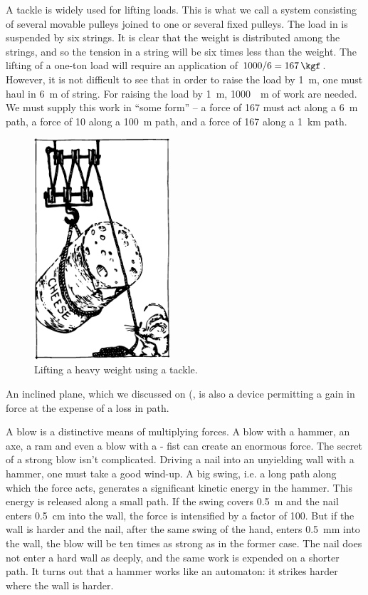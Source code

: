 A tackle is widely used for lifting loads. This is what
we call a system consisting of several movable pulleys
joined to one or several fixed pulleys. The load in  is suspended by six strings. It is clear that the weight
is distributed among the strings, and so the tension in
a string will be six times less than the weight. The lifting of a one-ton load will require an application of
$1000/6 = \SI{167}{\kgf}$. However, it is not difficult to see that
in order to raise the load by \SI{1}{\meter}, one must haul in \SI{6}{\meter}
of string. For raising the load by \SI{1}{\meter}, \SI{1000}{\kgf\meter} of
work are needed. We must supply this work in ``some form'' -- a force of  \SI{167}{\kgf} must act along a \SI{6}{\meter} path, a force of  \SI{10}{\kgf} along a  \SI{100}{\meter} path, and a force of \SI{167}{\kgf} along a \SI{1}{\kilo\meter} path.
 \begin{figure}[!ht]
 \centering
 \includegraphics[width=0.45\textwidth]{figures/fig-5-05.pdf}
 \caption{Lifting a heavy weight using a tackle.}
 \label{fig-5-05}
 \end{figure}

An inclined plane, which we discussed on (\pageref{inc-plane}, is also a device permitting a gain in force at the expense of a
loss in path.

A blow is a distinctive means of multiplying forces. A blow with a hammer, an axe, a ram and even a blow with a - fist can create an enormous force. The secret of a strong blow isn't complicated. Driving a nail into an unyielding wall with a hammer, one must take a good wind-up. A big swing, i.e. a long path along which the force acts, generates a significant kinetic energy in the hammer.
This energy is released along a small path. If the swing covers \SI{0,5}{\meter} and the nail enters \SI{0.5}{\centi\meter} into the wall, the force is intensified by a factor of 100. But if the wall is harder and the nail, after the same swing of the hand, enters \SI{0.5}{\milli\meter} into the wall, the blow will be ten times as strong as in the former case. The nail does not enter a hard wall as deeply, and the same work is expended on a shorter path. It turns out that a hammer works like an automaton: it strikes harder where the wall is harder.

